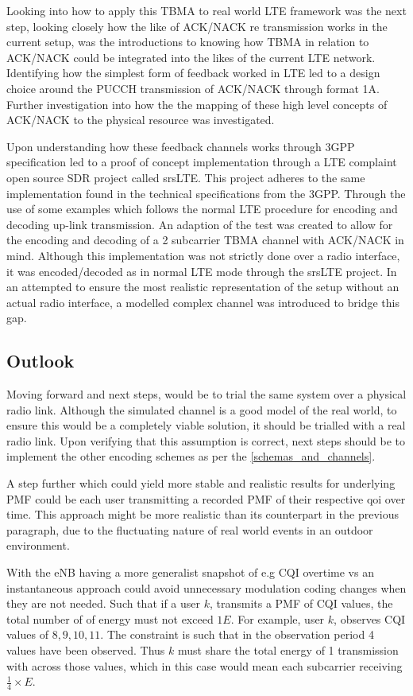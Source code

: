 \documentclass{article}
\begin{document}
 
Looking into how to apply this TBMA to real world LTE framework was the next step, looking closely how the like of ACK/NACK re transmission works in the current setup, was the introductions to knowing how TBMA in relation to ACK/NACK could be integrated into the likes of the current LTE network. Identifying how the simplest form of feedback worked in LTE led to a design choice around the PUCCH transmission of ACK/NACK through format 1A. Further investigation into how the the  mapping of these high level concepts of ACK/NACK to the physical resource was investigated. 

Upon understanding how these feedback channels works through 3GPP specification led to a proof of concept implementation through a LTE complaint open source SDR project called srsLTE. This project adheres to the same implementation found in the technical specifications from the 3GPP. Through the use of some examples which follows the normal LTE procedure for encoding and decoding up-link transmission. An adaption of the test was created to allow for the encoding and decoding of a 2 subcarrier TBMA channel with ACK/NACK in mind. Although this implementation was not strictly done over a radio interface, it was encoded/decoded as in normal LTE mode through the srsLTE project. In an attempted to ensure the most realistic representation of the setup without an actual radio interface, a modelled complex channel was introduced to bridge this gap. 


\subsection{Outlook}
Moving forward and next steps, would be to trial the same system over a physical radio link. Although the simulated channel is a good model of the real world, to ensure this would be a completely viable solution, it should be trialled with a real radio link. Upon verifying that this assumption is correct, next steps should be to implement the other encoding schemes as per the \cref{schemas_and_channels}. 

A step further which could yield more stable and realistic results for underlying PMF could be each user transmitting a recorded PMF of their respective \ac{qoi} over time. This approach might be more realistic than its counterpart in the previous paragraph, due to the fluctuating nature of real world events in an outdoor environment. 

With the eNB having a more generalist snapshot of e.g CQI overtime vs an instantaneous approach could avoid unnecessary modulation coding changes when they are not needed. Such that if a user $k$, transmits a PMF of CQI values, the total number of of energy must not exceed $1E$. For example, user $k$, observes \ac{CQI} values of $8,9,10,11$. The constraint is such that in the observation period  4 values have been observed. Thus $k$ must share the total energy of 1 transmission with across those values, which in this case would mean each subcarrier receiving $\frac{1}{4} \times E$.
\end{document}
